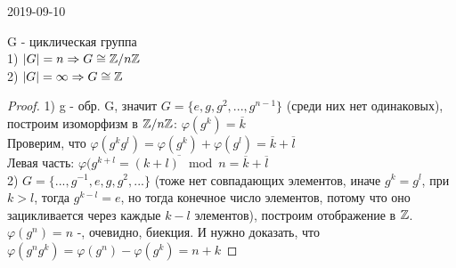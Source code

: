 \documentclass[main, 12pt, fleqn]{subfiles}
\begin{document}
\begin{lect} {2019-09-10}
\begin{theorem}
    G - циклическая группа\\
    1) $|G|=n \Rightarrow G \cong \mathbb{Z} / n \mathbb{Z}$\\
    2) $|G|=\infty \Rightarrow G \cong \mathbb{Z}$
\end{theorem}

\begin{proof}
    1) g - обр. G, значит $G=\{e,g,g^2,...,g^{n-1}\}$ (среди них нет одинаковых), построим изоморфизм в $\mathbb{Z} / n \mathbb{Z}$: $\varphi(g^k)=\overline{k}$\\
    Проверим, что $\varphi(g^k g^l)= \varphi(g^k)+\varphi(g^l)=\overline{k}+\overline{l}$\\
    Левая часть: $\varphi(g^{k+l}=\overline{(k+l) \mod n} = \overline{k}+\overline{l}$\\
    2) $G=\{...,g^{-1},e,g,g^2,...\}$ (тоже нет совпадающих элементов, иначе $g^k=g^l$, при $k>l$, тогда $g^{k-l}=e$, но тогда конечное число элементов, потому что оно зацикливается через каждые $k-l$ элементов), построим отображение в $\mathbb{Z}$.\\
    $\varphi(g^n)=n$ -, очевидно, биекция. И нужно доказать, что $\varphi(g^n g^k)=\varphi(g^n)-\varphi(g^k)=n+k$
\end{proof}

\end{lect}
\end{document}

